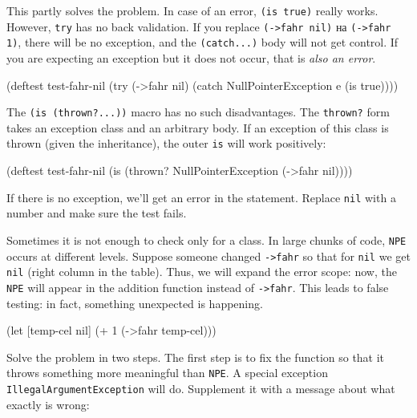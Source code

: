 This partly solves the problem. In case of an error, \verb|(is true)| really works. However, \verb|try| has no back validation. If you replace \verb|(->fahr nil)| на \verb|(->fahr 1)|, there will be no exception, and the \verb|(catch...)|  body will not get control. If you are expecting an exception but it does not occur, that is \emph{also an error}.


\begin{english}
  \begin{clojure}
(deftest test-fahr-nil
  (try
    (->fahr nil)
    (catch NullPointerException e
      (is true))))
  \end{clojure}
\end{english}

The \verb|(is (thrown?...))| macro has no such disadvantages. The \verb|thrown?| form takes an exception class and an arbitrary body. If an exception of this class is thrown (given the inheritance), the outer \verb|is| will work positively:

\begin{english}
  \begin{clojure}
(deftest test-fahr-nil
  (is (thrown? NullPointerException
               (->fahr nil))))
  \end{clojure}
\end{english}

If there is no exception, we'll get an error in the statement. Replace \verb|nil| with a number and make sure the test fails.


Sometimes it is not enough to check only for a class. In large chunks of code, \verb|NPE| occurs at different levels. Suppose someone changed \verb|->fahr| so that for \verb|nil| we get \verb|nil| (right column in the table). Thus, we will expand the error scope: now, the \verb|NPE| will appear in the addition function instead of \verb|->fahr|. This leads to false testing: in fact, something unexpected is happening.

\begin{english}
  \begin{clojure}
(let [temp-cel nil]
  (+ 1 (->fahr temp-cel)))
  \end{clojure}
\end{english}

\label{illegal-arg}

Solve the problem in two steps. The first step is to fix the function so that it throws something more meaningful than \verb|NPE|. A special exception \texttt{IllegalArgument\-Ex\-cep\-tion} will do. Supplement it with a message about what exactly is wrong:

